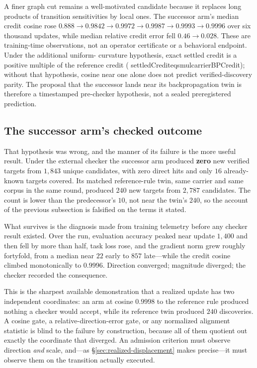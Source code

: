 \documentclass[11pt]{article}
\newcommand{\leanname}[1]{{\scriptsize\ttfamily
  \def\_{\textunderscore\allowbreak}#1}}
\begin{document}
A finer graph cut remains a well-motivated candidate because it replaces long products of
transition sensitivities by local ones.  The successor arm's median credit cosine rose
$0.888\to0.9842\to0.9972\to0.9987\to0.9993\to0.9996$ over six thousand updates, while
median relative credit error fell $0.46\to0.028$.  These are training-time observations,
not an operator certificate or a behavioral endpoint.  Under the additional uniform-
curvature hypothesis, exact settled credit is a positive multiple of the reference credit
(\leanname{settledCredit\_eq\_smul\_carrierBPCredit}); without that hypothesis, cosine
near one alone does not predict verified-discovery parity.  The proposal that the
successor lands near its backpropagation twin is therefore a timestamped pre-checker
hypothesis, not a sealed preregistered prediction.

\subsection{The successor arm's checked outcome}
\label{sec:successor-outcome}

That hypothesis was wrong, and the manner of its failure is the more useful result. Under
the external checker the successor arm produced \textbf{zero} new verified targets from
$1{,}843$ unique candidates, with zero direct hits and only $16$ already-known targets
covered. Its matched reference-rule twin, same carrier and same corpus in the same round,
produced $240$ new targets from $2{,}787$ candidates. The count is lower than the
predecessor's $10$, not near the twin's $240$, so the account of the previous subsection
is falsified on the terms it stated.

What survives is the diagnosis made from training telemetry before any checker result
existed. Over the run, evaluation accuracy peaked near update $1{,}400$ and then fell by
more than half, task loss rose, and the gradient norm grew roughly fortyfold, from a
median near $22$ early to $857$ late---while the credit cosine climbed monotonically to
$0.9996$. Direction converged; magnitude diverged; the checker recorded the consequence.

This is the sharpest available demonstration that a realized update has two independent
coordinates: an arm at cosine $0.9998$ to the reference rule produced nothing
a checker would accept, while its reference twin produced $240$ discoveries. A cosine
gate, a relative-direction-error gate, or any normalized alignment statistic is blind to
the failure by construction, because all of them quotient out exactly the coordinate that
diverged. An admission criterion must observe direction \emph{and} scale, and---as
\S\ref{sec:realized-displacement} makes precise---it must observe them on the transition
actually executed.
\end{document}
